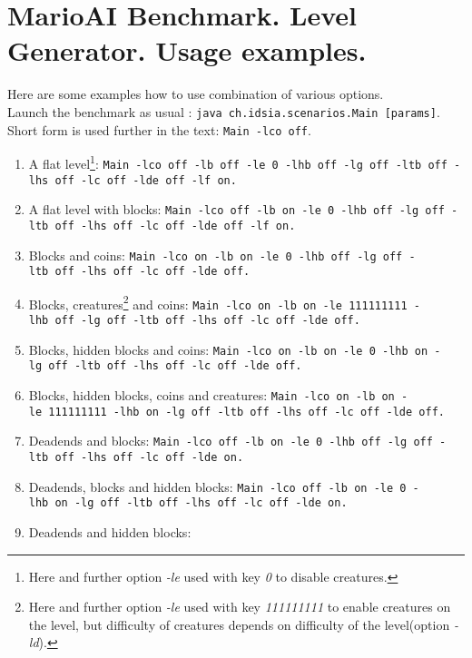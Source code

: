 \documentclass{report}
\begin{document}
\section*{MarioAI Benchmark. Level Generator. Usage examples.}
Here are some examples how to use combination of various options. \\
Launch the benchmark as usual : \texttt{java~ch.idsia.scenarios.Main [params]}. \\ Short form is used further in the text: \texttt{Main -lco off}.
\begin{enumerate}
\item A flat level\footnote{Here and further option \emph{-le} used with key \emph{0} to disable creatures.}: \newline %
\texttt{Main~-lco~off~-lb~off~-le~0~-lhb~off~-lg~off~-ltb~off~-lhs~off~-lc~off~-lde~off~-lf~on.}
\item A flat level with blocks:\newline %
\texttt{Main~-lco~off~-lb~on~-le~0~-lhb~off~-lg~off~-ltb~off~-lhs~off~-lc~off~-lde~off~-lf~on.}
\item Blocks and coins:\newline %
\texttt{Main~-lco~on~-lb~on~-le~0~-lhb~off~-lg~off~-ltb~off~-lhs~off~-lc~off~-lde~off.}
\item Blocks, creatures\footnote{Here and further option \emph{-le} used with key \emph{111111111} to enable creatures on the level, but difficulty of creatures depends on difficulty of the level(option \emph{-ld}).} and coins:\newline %
\texttt{Main~-lco~on~-lb~on~-le~111111111~-lhb~off~-lg~off~-ltb~off~-lhs~off~-lc~off~-lde~off.}
\item Blocks, hidden blocks and coins:\newline %
\texttt{Main~-lco~on~-lb~on~-le~0~-lhb~on~-lg~off~-ltb~off~-lhs~off~-lc~off~-lde~off.}
\item Blocks, hidden blocks, coins and creatures:\newline %
\texttt{Main~-lco~on~-lb~on~-le~111111111~-lhb~on~-lg~off~-ltb~off~-lhs~off~-lc~off~-lde~off.}
\item Deadends  and blocks:\newline %
\texttt{Main~-lco~off~-lb~on~-le~0~-lhb~off~-lg~off~-ltb~off~-lhs~off~-lc~off~-lde~on.}
\item Deadends, blocks and hidden blocks:\newline %
\texttt{Main~-lco~off~-lb~on~-le~0~-lhb~on~-lg~off~-ltb~off~-lhs~off~-lc~off~-lde~on.}
\item Deadends and hidden blocks:\newline %

\end{enumerate}
\end{document}
